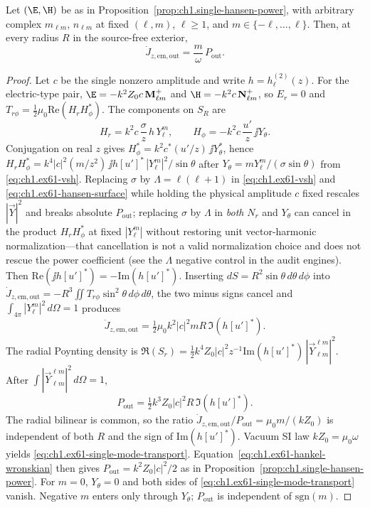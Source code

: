 \begin{proposition}
\label{prop:ch1.single-hansen-transport}
Let $(\E,\H)$ be as in Proposition~\ref{prop:ch1.single-hansen-power}, with arbitrary complex $m_{\ell m}$, $n_{\ell m}$ at fixed $(\ell,m)$, $\ell\ge 1$, and $m\in\{-\ell,\ldots,\ell\}$. Then, at every radius $R$ in the source-free exterior,
\begin{equation}
\label{eq:ch1.ex61-single-mode-transport}
\dot J_{z,\mathrm{em,out}}=\frac{m}{\omega}\,P_{\mathrm{out}}.
\end{equation}
\end{proposition}
\begin{proof}
Let $c$ be the single nonzero amplitude and write $h=h_\ell^{(2)}(z)$. For the electric-type pair, $\E=-k^2 Z_0 c\,\mathbf M_{\ell m}^+$ and $\H=-k^2 c\,\mathbf N_{\ell m}^+$, so $E_r=0$ and $T_{r\phi}=\tfrac12\mu_0\mathrm{Re}(H_r H_\phi^*)$. The components on $S_R$ are
\[
H_r=k^2 c\,\frac{\sigma}{z}\,h\,Y_\ell^m,\qquad
H_\phi=-k^2 c\,\frac{u'}{z}\,\jj Y_\theta.
\]
Conjugation on real $z$ gives $H_\phi^*=k^2 c^*(u'/z)\,\jj Y_\theta^*$, hence $H_r H_\phi^*=k^4|c|^2(m/z^2)\,\jj h[u']^*\,|Y_\ell^m|^2/\sin\theta$ after $Y_\theta=m Y_\ell^m/(\sigma\sin\theta)$ from \eqref{eq:ch1.ex61-vsh}. Replacing $\sigma$ by $\Lambda=\ell(\ell+1)$ in \eqref{eq:ch1.ex61-vsh} and \eqref{eq:ch1.ex61-hansen-surface} while holding the physical amplitude $c$ fixed rescales $|\vec Y|^2$ and breaks absolute $P_{\mathrm{out}}$; replacing $\sigma$ by $\Lambda$ in \emph{both} $N_r$ and $Y_\theta$ can cancel in the product $H_r H_\phi^*$ at fixed $|Y_\ell^m|$ without restoring unit vector-harmonic normalization---that cancellation is not a valid normalization choice and does not rescue the power coefficient (see the $\Lambda$ negative control in the audit engines). Then $\mathrm{Re}(\jj h[u']^*)=-\mathrm{Im}(h[u']^*)$. Inserting $dS=R^2\sin\theta\,d\theta\,d\phi$ into $\dot J_{z,\mathrm{em,out}}=-R^3\iint T_{r\phi}\sin^2\theta\,d\phi\,d\theta$, the two minus signs cancel and $\int_{4\pi}|Y_\ell^m|^2\,d\Omega=1$ produces
\[
\dot J_{z,\mathrm{em,out}}=\tfrac12\mu_0 k^2 |c|^2 m R\,\Im(h[u']^*).
\]
The radial Poynting density is $\Re(S_r)=\tfrac12 k^4 Z_0|c|^2 z^{-1}\mathrm{Im}(h[u']^*)\,|\vec Y_{\ell m}^{\ell m}|^2$. After $\int|\vec Y_{\ell m}^{\ell m}|^2\,d\Omega=1$,
\[
P_{\mathrm{out}}=\tfrac12 k^3 Z_0 |c|^2 R\,\Im(h[u']^*).
\]
The radial bilinear is common, so the ratio $\dot J_{z,\mathrm{em,out}}/P_{\mathrm{out}}=\mu_0 m/(k Z_0)$ is independent of both $R$ and the sign of $\mathrm{Im}(h[u']^*)$. Vacuum SI law $k Z_0=\mu_0\omega$ yields \eqref{eq:ch1.ex61-single-mode-transport}. Equation~\eqref{eq:ch1.ex61-hankel-wronskian} then gives $P_{\mathrm{out}}=k^2 Z_0|c|^2/2$ as in Proposition~\ref{prop:ch1.single-hansen-power}. For $m=0$, $Y_\theta=0$ and both sides of \eqref{eq:ch1.ex61-single-mode-transport} vanish. Negative $m$ enters only through $Y_\theta$; $P_{\mathrm{out}}$ is independent of $\mathrm{sgn}(m)$.


\end{proof}
